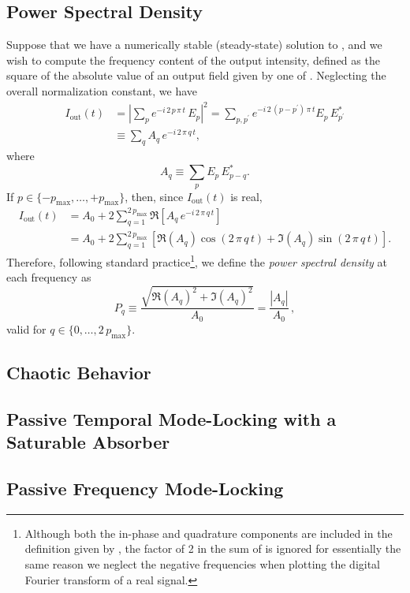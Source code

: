 \subsection{Power Spectral Density}
Suppose that we have a numerically stable (steady-state) solution to , and we wish to compute the frequency content of the output intensity, defined as the square of the absolute value of an output field given by one of . Neglecting the overall normalization constant, we have
 \begin{align}%
I_\text{out}(t) &= \left| \sum_{p} e^{-i\, 2\, p\, \pi\, t}\, E_p \right|^2 = \sum_{p, p^\prime} e^{-i\, 2\, (p - p^\prime)\, \pi\, t} E_p\, E^\ast_{p^\prime} \\
&\equiv \sum_q A_q\, e^{-i\, 2\, \pi\, q\, t} ,
 \end{align}
where
 \begin{equation}
A_q \equiv \sum_p E_p\, E^\ast_{p - q} .
 \end{equation}
If $p \in \{-p_\textrm{max}, \dots, +p_\textrm{max}\}$, then, since $I_\text{out}(t)$ is real,
 \begin{align} \label{eqn:mml_1d_iout_final}
I_\text{out}(t) &= A_0 + 2 \sum_{q = 1}^{2\, p_\textrm{max}} \Re\left[ A_q\, e^{-i\, 2\, \pi\, q\, t} \right] \\
&= A_0 + 2 \sum_{q = 1}^{2\, p_\textrm{max}} \left[ \Re(A_q) \cos(2\, \pi\, q\, t) + \Im(A_q) \sin(2\, \pi\, q\, t) \right] .
 \end{align}
Therefore, following standard practice\footnote{Although both the in-phase and quadrature components are included in the definition given by , the factor of 2 in the sum of  is ignored for essentially the same reason we neglect the negative frequencies when plotting the digital Fourier transform of a real signal.}, we define the \emph{power spectral density} at each frequency as
 \begin{equation} \label{eqn:mml_1d_psd_def}
P_q \equiv \frac{\sqrt{\Re(A_q)^2 + \Im(A_q)^2}}{A_0} = \frac{|A_q|}{A_0}\, ,
 \end{equation}
valid for $q \in \{0, \dots, 2\, p_\textrm{max}\}$.

 \subsection{Chaotic Behavior}
 \subsection{Passive Temporal Mode-Locking with a Saturable Absorber}
 \subsection{Passive Frequency Mode-Locking}


